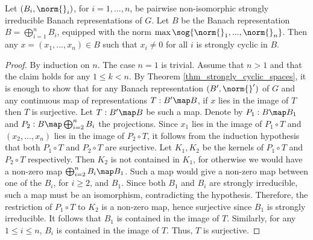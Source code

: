 \begin{prop}\label{prop_small_representations}
Let $(B_i,\norm{}_i)$, for $i=1,...,n$, be pairwise non-isomorphic strongly irreducible Banach representations of $G$. 
Let $B$ be the Banach representation $B=\bigoplus_{i=1}^nB_i$, equipped with the norm $\max\sog{\norm{}_1,...,\norm{}_n}$.
Then any $x=(x_1,...,x_n)\in B$ such that $x_i\neq 0$ for all $i$ is strongly cyclic in $B$.
\end{prop} 
    \begin{proof}
    By induction on $n$.
    The case $n=1$ is trivial.
    Assume that $n>1$ and that the claim holds for any $1\leq k<n$.
    By Theorem \ref{thm_strongly_cyclic_spaces}, it is enough to show that for any Banach representation $(B',\norm{}')$ of $G$ and any continuous map of representations $T:B'\map B$, if $x$ lies in the image of $T$ then $T$ is surjective.
    Let $T:B'\map B$ be such a map.
    Denote by $P_1:B\map B_1$ and $P_2:B\map \bigoplus_{i=2}^nB_i$ the projections.
    Since $x_1$ lies in the image of $P_1\circ T$ and $(x_2,...,x_n)$ lies in the image of $P_2\circ T$, it follows from the induction hypothesis that both $P_1\circ T$ and $P_2\circ T$ are surjective.
    Let $K_1,K_2$ be the kernels of $P_1\circ T$ and $P_2\circ T$ respectively.
    Then $K_2$ is not contained in $K_1$, for otherwise we would have a non-zero map $\bigoplus_{i=2}^nB_i\map B_1$.
    Such a map would give a non-zero map between one of the $B_i$, for $i\geq 2$, and $B_1$.
    Since both $B_1$ and $B_i$ are strongly irreducible, such a map must be an isomorphism, contradicting the hypothesis.
    Therefore, the restriction of $P_1\circ T$ to $K_2$ is a non-zero map, hence surjective since $B_1$ is strongly irreducible.
    It follows that $B_1$ is contained in the image of $T$.
    Similarly, for any $1\leq i\leq n$, $B_i$ is contained in the image of $T$.
    Thus, $T$ is surjective.
    \end{proof} 
    
